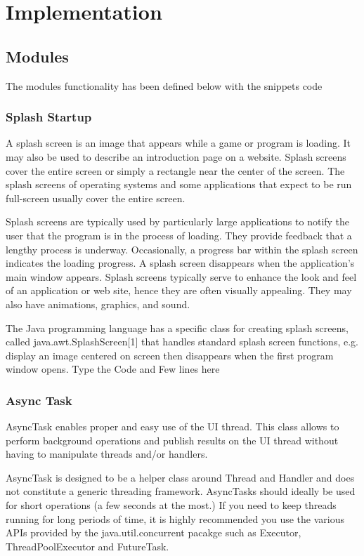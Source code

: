 \chapter{Implementation}

\section{Modules }
The modules functionality has been defined below with the snippets code
\subsection{Splash Startup}

A splash screen is an image that appears while a game or program is loading. It may also be used to describe an introduction page on a website. Splash screens cover the entire screen or simply a rectangle near the center of the screen. The splash screens of operating systems and some applications that expect to be run full-screen usually cover the entire screen.

Splash screens are typically used by particularly large applications to notify the user that the program is in the process of loading. They provide feedback that a lengthy process is underway. Occasionally, a progress bar within the splash screen indicates the loading progress. A splash screen disappears when the application's main window appears.
Splash screens typically serve to enhance the look and feel of an application or web site, hence they are often visually appealing. They may also have animations, graphics, and sound.

The Java programming language has a specific class for creating splash screens, called java.awt.SplashScreen[1] that handles standard splash screen functions, e.g. display an image centered on screen then disappears when the first program window opens.
Type the Code and Few lines here



\subsection{Async Task }

AsyncTask enables proper and easy use of the UI thread. This class allows to perform background operations and publish results on the UI thread without having to manipulate threads and/or handlers.

AsyncTask is designed to be a helper class around Thread and Handler and does not constitute a generic threading framework. AsyncTasks should ideally be used for short operations (a few seconds at the most.) If you need to keep threads running for long periods of time, it is highly recommended you use the various APIs provided by the java.util.concurrent pacakge such as Executor, ThreadPoolExecutor and FutureTask.

